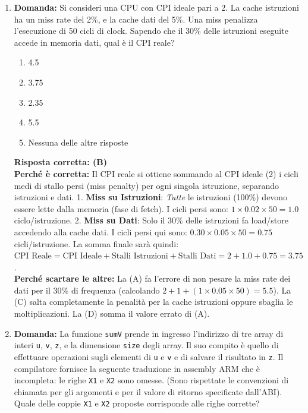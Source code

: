 \documentclass[12pt, a4paper]{article}
\begin{document}
\begin{enumerate}
    \item \textbf{Domanda:} Si consideri una CPU con CPI ideale pari a 2. La cache istruzioni ha un miss rate del 2\%, e la cache dati del 5\%. Una miss penalizza l'esecuzione di 50 cicli di clock. Sapendo che il 30\% delle istruzioni eseguite accede in memoria dati, qual è il CPI reale?
    \begin{enumerate}[label=(\Alph*)]
        \item 4.5
        \item 3.75
        \item 2.35
        \item 5.5
        \item Nessuna delle altre risposte
    \end{enumerate}
    \textbf{Risposta corretta: (B)} \\
    \textbf{Perché è corretta:} Il CPI reale si ottiene sommando al CPI ideale (2) i cicli medi di stallo persi (miss penalty) per ogni singola istruzione, separando istruzioni e dati. 
    1. \textbf{Miss su Istruzioni}: \textit{Tutte} le istruzioni (100\%) devono essere lette dalla memoria (fase di fetch). I cicli persi sono: $1 \times 0.02 \times 50 = 1.0$ ciclo/istruzione.
    2. \textbf{Miss su Dati}: Solo il 30\% delle istruzioni fa load/store accedendo alla cache dati. I cicli persi qui sono: $0.30 \times 0.05 \times 50 = 0.75$ cicli/istruzione.
    La somma finale sarà quindi: $\text{CPI Reale} = \text{CPI Ideale} + \text{Stalli Istruzioni} + \text{Stalli Dati} = 2 + 1.0 + 0.75 = 3.75$. \\
    \textbf{Perché scartare le altre:} La (A) fa l'errore di non pesare la miss rate dei dati per il 30\% di frequenza (calcolando $2 + 1 + (1 \times 0.05 \times 50) = 5.5$). La (C) salta completamente la penalità per la cache istruzioni oppure sbaglia le moltiplicazioni. La (D) somma il valore errato di (A).

\newpage

    \item \textbf{Domanda:} La funzione \texttt{sumV} prende in ingresso l'indirizzo di tre array di interi \texttt{u}, \texttt{v}, \texttt{z}, e la dimensione \texttt{size} degli array. Il suo compito è quello di effettuare operazioni sugli elementi di \texttt{u} e \texttt{v} e di salvare il risultato in \texttt{z}. Il compilatore fornisce la seguente traduzione in assembly ARM che è incompleta: le righe \texttt{X1} e \texttt{X2} sono omesse. (Sono rispettate le convenzioni di chiamata per gli argomenti e per il valore di ritorno specificate dall'ABI). Quale delle coppie \texttt{X1} e \texttt{X2} proposte corrisponde alle righe corrette?


\end{enumerate}
\end{document}
